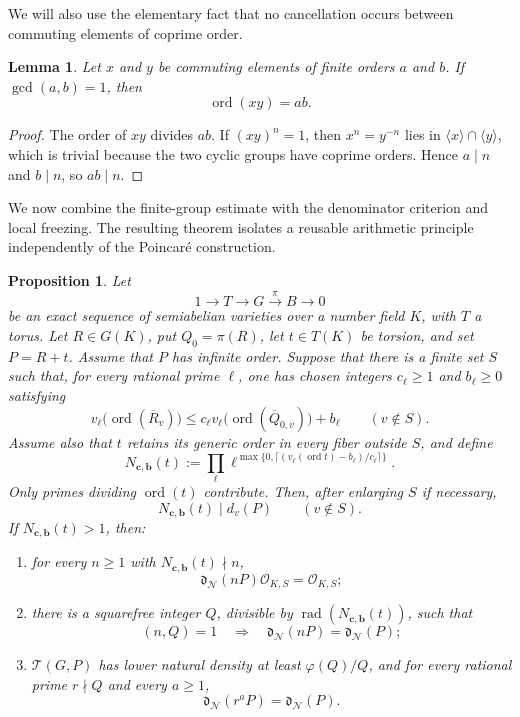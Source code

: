 \documentclass[11pt,letterpaper,reqno]{amsart}
\newtheorem{proposition}[theorem]{Proposition}
\newtheorem{lemma}[theorem]{Lemma}
\theoremstyle{definition}
\theoremstyle{remark}
\newcommand{\ord}{\operatorname{ord}}
\newcommand{\rad}{\operatorname{rad}}
\newcommand{\dd}{\mathfrak d}
\newcommand{\cO}{\mathcal O}
\newcommand{\Ner}{\mathcal N}
\begin{document}
We will also use the elementary fact that no cancellation occurs between
commuting elements of coprime order.

\begin{lemma}\label{lem:coprime-orders}
Let $x$ and $y$ be commuting elements of finite orders $a$ and $b$.  If
$\gcd(a,b)=1$, then
\[
 \ord(xy)=ab.
\]
\end{lemma}

\begin{proof}
The order of $xy$ divides $ab$.  If $(xy)^n=1$, then $x^n=y^{-n}$ lies in
$\langle x\rangle\cap\langle y\rangle$, which is trivial because the two
cyclic groups have coprime orders.  Hence $a\mid n$ and $b\mid n$, so
$ab\mid n$.
\end{proof}

We now combine the finite-group estimate with the denominator criterion and
local freezing.  The resulting theorem isolates a reusable arithmetic
principle independently of the Poincar\'e construction.

\begin{proposition}
\label{thm:abstract-shift}
Let
\[
 1\longrightarrow T\longrightarrow G\xrightarrow{\pi}B\longrightarrow0
\]
be an exact sequence of semiabelian varieties over a number field $K$, with
$T$ a torus.  Let $R\in G(K)$, put $Q_0=\pi(R)$, let $t\in T(K)$ be torsion,
and set $P=R+t$.  Assume that $P$ has infinite order.  Suppose that there is a
finite set $S$ such that, for every rational prime $\ell$, one has chosen
integers $c_\ell\ge1$ and $b_\ell\ge0$ satisfying
\begin{equation}\label{eq:abstract-local-control}
 v_\ell\bigl(\ord(\overline R_v)\bigr)
 \le c_\ell v_\ell\bigl(\ord(\overline Q_{0,v})\bigr)+b_\ell
 \qquad(v\notin S).
\end{equation}
Assume also that $t$ retains its generic order in every fiber outside $S$, and
define
\begin{equation}\label{eq:abstract-N}
 N_{\mathbf c,\mathbf b}(t):=\prod_\ell
 \ell^{\max\{0,\lceil(v_\ell(\ord t)-b_\ell)/c_\ell\rceil\}}.
\end{equation}
Only primes dividing $\ord(t)$ contribute.  Then, after enlarging $S$ if
necessary,
\[
 N_{\mathbf c,\mathbf b}(t)\mid d_v(P)
 \qquad(v\notin S).
\]
If $N_{\mathbf c,\mathbf b}(t)>1$, then:
\begin{enumerate}[label=\textup{(\roman*)}]
\item for every $n\ge1$ with $N_{\mathbf c,\mathbf b}(t)\nmid n$,
\[
 \dd_{\Ner}(nP)\cO_{K,S}=\cO_{K,S};
\]
\item there is a squarefree integer $Q$, divisible by
$\rad(N_{\mathbf c,\mathbf b}(t))$, such that
\begin{equation}\label{eq:abstract-coprime-return}
 (n,Q)=1\quad\Longrightarrow\quad
 \dd_{\Ner}(nP)=\dd_{\Ner}(P);
\end{equation}
\item $\mathscr T(G,P)$ has lower natural density at least $\varphi(Q)/Q$, and
for every rational prime $r\nmid Q$ and every $a\ge1$,
\[
 \dd_{\Ner}(r^{a}P)=\dd_{\Ner}(P).
\]
\end{enumerate}
\end{proposition}
\end{document}
